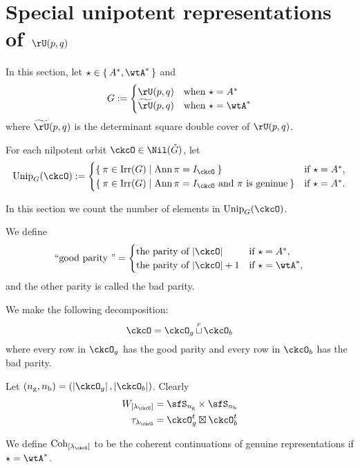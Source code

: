 \documentclass[counting_main.tex]{subfiles}
\begin{document}
\section{Special unipotent representations of $\rU(p,q)$}
\def\nbb{n_{\mathrm b}}
\def\ngg{n_{\mathrm g}}
\def\tU{\widetilde{\rU}}

In this section, let $\star \in \set{A^{*}, \wtA^{*}}$ and
\[
  G :=
  \begin{cases}
    \rU(p,q)  & \text{when }\star = A^{*}\\
    \tU(p,q)  & \text{when }\star = \wtA^{*}
\end{cases}
\]
where $\tU(p,q)$ is the determinant square double cover of $\rU(p,q)$.

For each nilpotent orbit $\ckcO\in \Nil(\ckG)$, let
\[
  \Unip_{G}(\ckcO) :=
  \begin{cases}
   \Set{\pi\in \Irr(G)| \Ann\pi = I_{\ckcO}} & \text{if $\star = A^{*}$}, \\
   \Set{\pi\in \Irr(G)| \Ann\pi = I_{\ckcO} \text{ and $\pi$ is
       geninue}} & \text{if $\star = A^{*}$}. \\
  \end{cases}
\]

In this section we count the number of elements in $\Unip_{G}(\ckcO)$.

We define
\[
  \text{``good parity ''} = \begin{cases}
    \text{the parity of $\abs{\ckcO}$} &  \text{if $\star = A^{*}$}, \\
    \text{the parity of $\abs{\ckcO}+1$} &  \text{if $\star = \wtA^{*}$}, \\
  \end{cases}
\]
and the other parity is called the bad parity.

We make the following decomposition:
\[
\ckcO = \ckcO_{g}\cuprow \ckcO_{b}
\]
where every row in $\ckcO_{g}$ has the good parity
and every row in $\ckcO_{b}$ has the bad parity.

Let $(\ngg,\nbb) = (\abs{\ckcO_g},\abs{\ckcO_b})$.
Clearly
\[
  \begin{split}
    \WLamck &= \sfS_{\ngg}\times \sfS_{\nbb}\\
    \tau_{\lamck}  & = \ckcO_{g}^{t}\boxtimes \ckcO_{b}^{t}\\
  \end{split}
\]

We define $\Coh_{\Lamck}$ to be the coherent continuations of genuine
representations if $\star = \wtA^{*}$.
\end{document}
